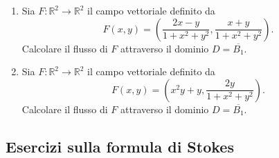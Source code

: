 \begin{enumerate}[label=\textbf{\arabic*}, leftmargin=*, start=1]
	\item Sia \( F: \mathbb{R}^2 \to \mathbb{R}^2 \) il campo vettoriale definito da
	\[
	F(x, y) = (\frac{2x-y}{1+x^2+y^2}, \frac{x+y}{1+x^2+y^2}).
	\]
	Calcolare il flusso di \( F \) attraverso il dominio \( D = \overline{B_1} \).
	
	\item Sia \( F: \mathbb{R}^2 \to \mathbb{R}^2 \) il campo vettoriale definito da
	\[
	F(x, y) = (x^2 y + y, \frac{2y}{1+x^2+y^2}).
	\]
	Calcolare il flusso di \( F \) attraverso il dominio \( D = \overline{B_1} \).
	
	
\end{enumerate}

\subsection*{Esercizi sulla formula di Stokes}

